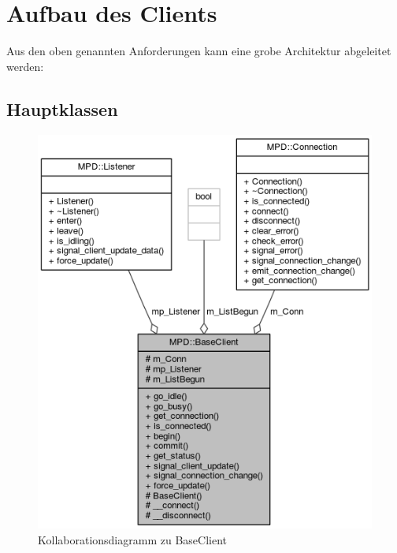 \section{Aufbau des Clients}

Aus den oben genannten Anforderungen kann eine grobe Architektur abgeleitet werden:


\subsection{Hauptklassen}

\begin{figure}[htb!]
	\centering
        \includegraphics[scale=0.6]{BaseClientCollab.png}
	\caption{Kollaborationsdiagramm zu BaseClient}
	\label{collab_base_client}
\end{figure}

